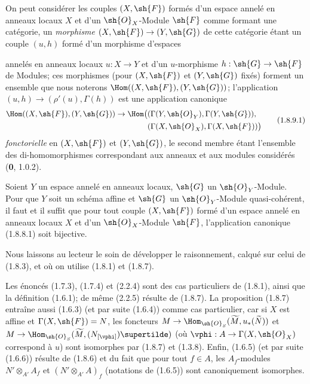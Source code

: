 \begin{env}[1.8.9]
\label{ega2:addendum:I.1.8.9-fr}
On peut considérer les couples $(X,\sh{F})$ formés d'un espace annelé
en anneaux locaux $X$ et d'un $\sh{O}_X$-Module $\sh{F}$ comme formant
une catégorie, un \emph{morphisme} $(X,\sh{F})\to(Y,\sh{G})$ de cette catégorie
étant un couple $(u,h)$ formé d'un morphisme d'espaces
annelés en anneaux locaux $u:X\to Y$ et d'un $u$-morphisme
$h:\sh{G}\to\sh{F}$ de Modules; ces
morphismes (pour $(X,\sh{F})$ et $(Y,\sh{G})$ fixés) forment un ensemble
que nous noterons $\Hom((X,\sh{F}),(Y,\sh{G}))$; l'application
$(u,h)\to(\rho'(u),\Gamma(h))$ est une application canonique
\begin{equation}
\label{ega2:addendum:I.1.8.9.1-fr}
\begin{split}
  \Hom((X,\sh{F}),(Y,\sh{G}))\to
  \Hom\bigl(
    &(\Gamma(Y,\sh{O}_Y),\Gamma(Y,\sh{G})),\\
    &(\Gamma(X,\sh{O}_X),\Gamma(X,\sh{F}))
  \bigr)
\end{split}
\tag{1.8.9.1}
\end{equation}
\emph{fonctorielle} en $(X,\sh{F})$ et $(Y,\sh{G})$, le second membre étant
l'ensemble des di-homomorphismes correspondant aux anneaux et aux
modules considérés (\textbf{0}, 1.0.2).
\end{env}

\begin{corollary}[1.8.10]
\label{ega2:addendum:I.1.8.10-fr}
Soient $Y$ un espace annelé en anneaux locaux, $\sh{G}$ un
$\sh{O}_Y$-Module. Pour que $Y$ soit un schéma affine et $\sh{G}$ un
$\sh{O}_Y$-Module quasi-cohérent, il faut et il suffit que pour tout
couple $(X,\sh{F})$ formé d'un espace annelé en anneaux locaux $X$ et
d'un $\sh{O}_X$-Module $\sh{F}$, l'application canonique \textup{(1.8.8.1)} soit
bijective.
\end{corollary}

Nous laissons au lecteur le soin de développer le raisonnement, calqué
sur celui de (1.8.3), et où on utilise (1.8.1) et (1.8.7).

\begin{remark}[1.8.11]
\label{ega2:addendum:I.1.8.11-fr}
Les énoncés (1.7.3), (1.7.4) et (2.2.4) sont des cas
particuliers de (1.8.1), ainsi que la définition (1.6.1); de même
(2.2.5) résulte de (1.8.7). La proposition (1.8.7) entraîne aussi
(1.6.3) (et par suite (1.6.4)) comme cas particulier, car si $X$
est affine et $\Gamma(X,\sh{F})=N$, les foncteurs
$M\to
  \Hom_{\sh{O}_S}(\widetilde M,u_*(\widetilde N))$ et
$M\to
  \Hom_{\sh{O}_S}(\widetilde M,(N_{[\vphi]})\supertilde)$
(où $\vphi:A\to\Gamma(X,\sh{O}_X)$ correspond à $u$) sont isomorphes
par (1.8.7) et (1.3.8). Enfin, (1.6.5) (et par suite (1.6.6))
résulte de (1.8.6) et du fait que pour tout $f\in A$, les $A_f$-modules
$N'\otimes_{A'}A_f$ et $(N'\otimes_{A'}A)_f$
(notations de (1.6.5)) sont canoniquement isomorphes.
\end{remark}

